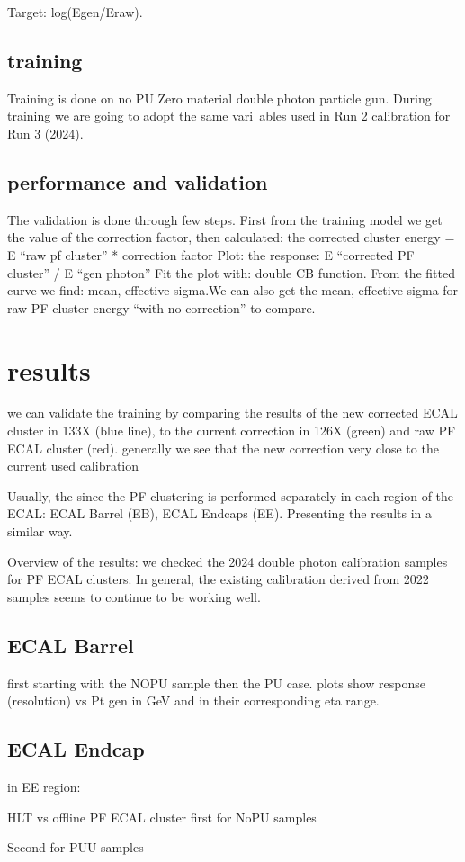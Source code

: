 Target: log(Egen/Eraw).

\subsection{training}
Training is done on no PU Zero material double photon particle gun. During training we are going to adopt the same vari\
ables used in Run 2 calibration for Run 3 (2024).

\subsection{performance and validation}
The validation is done through few steps. First from the training model we get the value of the correction factor, then  calculated:  the corrected cluster energy = E “raw pf cluster” * correction factor Plot: the response: E “corrected PF cluster” / E “gen photon” Fit the plot with: double CB function. From the fitted curve we find: mean, effective sigma.We can also get the mean, effective sigma for raw PF cluster energy “with no correction” to compare.
 
\section{results}

we can validate the training by comparing the results of the new corrected ECAL cluster in 133X (blue line), to the current  correction in 126X (green) and  raw PF ECAL cluster (red).
generally we see that the new  correction very close to the current used calibration

Usually, the since the PF clustering is performed separately in each region of the ECAL: ECAL Barrel (EB), ECAL Endcaps (EE).
Presenting the results in a similar way.

Overview of the results: we checked the 2024 double photon calibration samples for PF ECAL clusters. In general, the existing calibration derived from 2022 samples seems to continue to be working well.

\subsection{ECAL Barrel}
first starting with the NOPU sample then the PU case.
plots show response (resolution) vs Pt gen in GeV and in their corresponding eta range.





\subsection{ECAL Endcap}
in EE region:





HLT vs offline PF ECAL cluster
first for NoPU samples

Second for PUU samples

